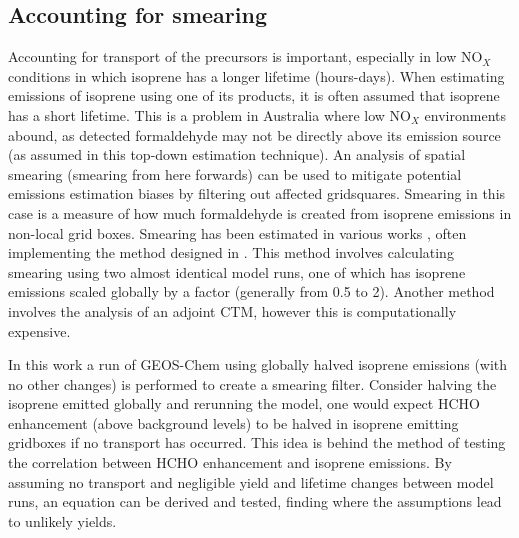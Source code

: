   
  \subsection{Accounting for smearing}
    \label{BioIsop:Method:Smearing}
    
    Accounting for transport of the precursors is important, especially in low NO$_X$ conditions in which isoprene has a longer lifetime (hours-days).
    When estimating emissions of isoprene using one of its products, it is often assumed that isoprene has a short lifetime.
    This is a problem in Australia where low NO$_X$ environments abound, as detected formaldehyde may not be directly above its emission source (as assumed in this top-down estimation technique).
    An analysis of spatial smearing (smearing from here forwards) can be used to mitigate potential emissions estimation biases by filtering out affected gridsquares.
    Smearing in this case is a measure of how much formaldehyde is created from isoprene emissions in non-local grid boxes.
    Smearing has been estimated in various works \parencite[eg.][]{Martin2003, Palmer2003, Millet2006, Stavrakou2009, Marais2012, Barkley2013, Zhu2014, Wolfe2016, Surl2018}, often implementing the method designed in \textcite{Palmer2003}.
    This method involves calculating smearing using two almost identical model runs, one of which has isoprene emissions scaled globally by a factor (generally from 0.5 to 2).
    Another method \parencite[eg.][]{Stavrakou2009} involves the analysis of an adjoint CTM, however this is computationally expensive.
    
    In this work a run of GEOS-Chem using globally halved isoprene emissions (with no other changes) is performed to create a smearing filter.
    Consider halving the isoprene emitted globally and rerunning the model, one would expect HCHO enhancement (above background levels) to be halved in isoprene emitting gridboxes if no transport has occurred.
    This idea is behind the method of testing the correlation between HCHO enhancement and isoprene emissions.
    By assuming no transport and negligible yield and lifetime changes between model runs, an equation can be derived and tested, finding where the assumptions lead to unlikely yields.
    
